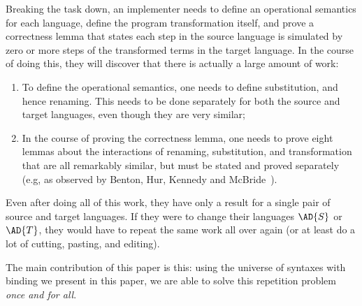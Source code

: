 Breaking the task down, an implementer needs to define an operational
semantics for each language, define the program transformation itself,
and prove a correctness lemma that states each step in the source
language is simulated by zero or more steps of the transformed terms
in the target language. In the course of doing this, they will
discover that there is actually a large amount of work:

\begin{enumerate}
\item To define the operational semantics, one needs to define
  substitution, and hence renaming. This needs to be done separately
  for both the source and target languages, even though they are very
  similar;
\item In the course of proving the correctness lemma, one needs to
  prove eight lemmas about the interactions of renaming, substitution,
  and transformation that are all remarkably similar, but must be
  stated and proved separately (e.g, as observed by Benton, Hur, Kennedy
  and McBride~\citeyear{benton2012strongly}).
\end{enumerate}

Even after doing all of this work, they have only a result for a single
pair of source and target languages. If they were to change their
languages $\AD{S}$ or $\AD{T}$, they would have to repeat the same work
all over again (or at least do a lot of cutting, pasting, and
editing).

The main contribution of this paper is this: using the universe of
syntaxes with binding we present in this paper, we are able to solve
this repetition problem \emph{once and for all}.


